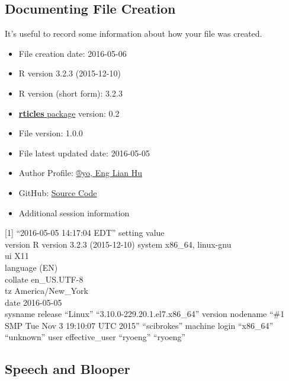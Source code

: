 \documentclass[article]{jss}
\providecommand{\tightlist}{%
  \setlength{\itemsep}{0pt}\setlength{\parskip}{0pt}}
\begin{document}
\subsection{Documenting File Creation}\label{documenting-file-creation}

It's useful to record some information about how your file was created.

\begin{itemize}
\tightlist
\item
  File creation date: 2016-05-06
\item
  R version 3.2.3 (2015-12-10)
\item
  R version (short form): 3.2.3
\item
  \href{https://github.com/rstudio/rticles}{\textbf{rticles} package}
  version: 0.2
\item
  File version: 1.0.0
\item
  File latest updated date: 2016-05-05
\item
  Author Profile:
  \href{https://beta.rstudioconnect.com/englianhu/ryo-eng/}{®yo, Eng
  Lian Hu}
\item
  GitHub:
  \href{https://github.com/scibrokes/odds-modelling-and-testing-inefficiency-of-sports-bookmakers}{Source
  Code}
\item
  Additional session information
\end{itemize}

{[}1{]} ``2016-05-05 14:17:04 EDT'' setting value\\
 version R version 3.2.3 (2015-12-10) system x86\_64, linux-gnu\\
 ui X11\\
 language (EN)\\
 collate en\_US.UTF-8\\
 tz America/New\_York\\
 date 2016-05-05\\
 sysname release ``Linux'' ``3.10.0-229.20.1.el7.x86\_64'' version
nodename ``\#1 SMP Tue Nov 3 19:10:07 UTC 2015'' ``scibrokes'' machine
login ``x86\_64'' ``unknown'' user effective\_user ``ryoeng'' ``ryoeng''

\subsection{Speech and Blooper}\label{speech-and-blooper}
\end{document}
